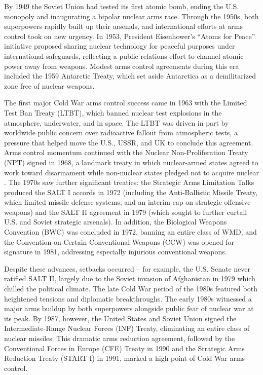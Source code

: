 \documentclass[11,5 pt]{article}
\begin{document}
    By 1949 the Soviet Union had tested its first atomic bomb, ending the U.S. monopoly and inaugurating a bipolar nuclear arms race. Through the 1950s, both superpowers rapidly built up their arsenals, and international efforts at arms control took on new urgency. In 1953, President Eisenhower’s “Atoms for Peace” initiative proposed sharing nuclear technology for peaceful purposes under international safeguards, reflecting a public relations effort to channel atomic power away from weapons. Modest arms control agreements during this era included the 1959 Antarctic Treaty, which set aside Antarctica as a demilitarized zone free of nuclear weapons. 
    
    The first major Cold War arms control success came in 1963 with the Limited Test Ban Treaty (LTBT), which banned nuclear test explosions in the atmosphere, underwater, and in space. The LTBT was driven in part by worldwide public concern over radioactive fallout from atmospheric tests, a pressure that helped move the U.S., USSR, and UK to conclude this agreement. Arms control momentum continued with the Nuclear Non-Proliferation Treaty (NPT) signed in 1968, a landmark treaty in which nuclear-armed states agreed to work toward disarmament while non-nuclear states pledged not to acquire nuclear  \cite{BritannicaNuclearTestBan}. The 1970s saw further significant treaties: the Strategic Arms Limitation Talks produced the SALT I accords in 1972 (including the Anti-Ballistic Missile Treaty, which limited missile defense systems, and an interim cap on strategic offensive weapons) and the SALT II agreement in 1979 (which sought to further curtail U.S. and Soviet strategic arsenals). In addition, the Biological Weapons Convention (BWC) was concluded in 1972, banning an entire class of WMD, and the Convention on Certain Conventional Weapons (CCW) was opened for signature in 1981, addressing especially injurious conventional weapons. 
    
    Despite these advances, setbacks occurred – for example, the U.S. Senate never ratified SALT II, largely due to the Soviet invasion of Afghanistan in 1979 which chilled the political climate. The late Cold War period of the 1980s featured both heightened tensions and diplomatic breakthroughs. The early 1980s witnessed a major arms buildup by both superpowers alongside public fear of nuclear war at its peak. By 1987, however, the United States and Soviet Union signed the Intermediate-Range Nuclear Forces (INF) Treaty, eliminating an entire class of nuclear missiles. This dramatic arms reduction agreement, followed by the Conventional Forces in Europe (CFE) Treaty in 1990 and the Strategic Arms Reduction Treaty (START I) in 1991, marked a high point of Cold War arms control. 
    
\end{document}
